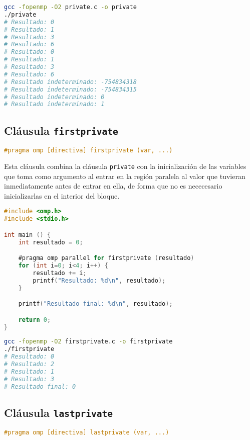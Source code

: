 \begin{lstlisting}[language=sh]
gcc -fopenmp -O2 private.c -o private
./private
# Resultado: 0
# Resultado: 1
# Resultado: 3
# Resultado: 6
# Resultado: 0
# Resultado: 1
# Resultado: 3
# Resultado: 6
# Resultado indeterminado: -754834318
# Resultado indeterminado: -754834315
# Resultado indeterminado: 0
# Resultado indeterminado: 1
\end{lstlisting}

\subsection{Cláusula \texttt{firstprivate}}

\begin{lstlisting}[language=C]
#pragma omp [directiva] firstprivate (var, ...)
\end{lstlisting}

Esta cláusula combina la cláusula \texttt{private} con la inicialización de las variables que toma como argumento al entrar en la región paralela al valor que tuvieran inmediatamente antes de entrar en ella, de forma que no es nececesario inicializarlas en el interior del bloque.

\begin{lstlisting}[language=C]
#include <omp.h>
#include <stdio.h>

int main () {
	int resultado = 0;

	#pragma omp parallel for firstprivate (resultado)
	for (int i=0; i<4; i++) {
		resultado += i;
		printf("Resultado: %d\n", resultado);
	}

	printf("Resultado final: %d\n", resultado);

	return 0;
}
\end{lstlisting}

\begin{lstlisting}[language=sh]
gcc -fopenmp -O2 firstprivate.c -o firstprivate
./firstprivate
# Resultado: 0
# Resultado: 2
# Resultado: 1
# Resultado: 3
# Resultado final: 0
\end{lstlisting}

\subsection{Cláusula \texttt{lastprivate}}

\begin{lstlisting}[language=C]
#pragma omp [directiva] lastprivate (var, ...)
\end{lstlisting}

